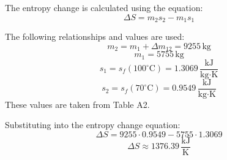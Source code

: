 The entropy change is calculated using the equation:  
\[
\Delta S = m_2 s_2 - m_1 s_1
\]  

The following relationships and values are used:  
\[
m_2 = m_1 + \Delta m_{12} = 9255 \, \text{kg}
\]  
\[
m_1 = 5755 \, \text{kg}
\]  
\[
s_1 = s_f(100^\circ\text{C}) = 1.3069 \, \frac{\text{kJ}}{\text{kg·K}}
\]  
\[
s_2 = s_f(70^\circ\text{C}) = 0.9549 \, \frac{\text{kJ}}{\text{kg·K}}
\]  
These values are taken from Table A2.  

Substituting into the entropy change equation:  
\[
\Delta S = 9255 \cdot 0.9549 - 5755 \cdot 1.3069
\]  
\[
\Delta S \approx 1376.39 \, \frac{\text{kJ}}{\text{K}}
\]